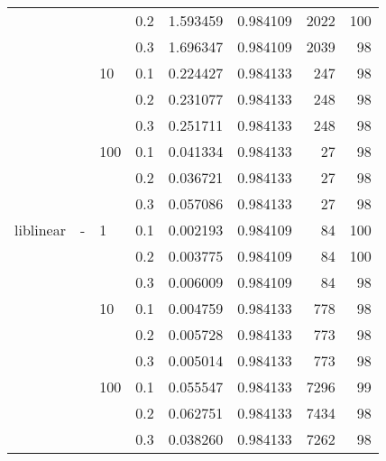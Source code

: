 \begin{table}[H]
\begin{tabular}{llllrrrr}
          &   &     & 0.2 &  1.593459 &  0.984109 &    2022 &   100 \\
          &   &     & 0.3 &  1.696347 &  0.984109 &    2039 &    98 \\
          &   & 10  & 0.1 &  0.224427 &  0.984133 &     247 &    98 \\
          &   &     & 0.2 &  0.231077 &  0.984133 &     248 &    98 \\
          &   &     & 0.3 &  0.251711 &  0.984133 &     248 &    98 \\
          &   & 100 & 0.1 &  0.041334 &  0.984133 &      27 &    98 \\
          &   &     & 0.2 &  0.036721 &  0.984133 &      27 &    98 \\
          &   &     & 0.3 &  0.057086 &  0.984133 &      27 &    98 \\
liblinear & - & 1   & 0.1 &  0.002193 &  0.984109 &      84 &   100 \\
          &   &     & 0.2 &  0.003775 &  0.984109 &      84 &   100 \\
          &   &     & 0.3 &  0.006009 &  0.984109 &      84 &    98 \\
          &   & 10  & 0.1 &  0.004759 &  0.984133 &     778 &    98 \\
          &   &     & 0.2 &  0.005728 &  0.984133 &     773 &    98 \\
          &   &     & 0.3 &  0.005014 &  0.984133 &     773 &    98 \\
          &   & 100 & 0.1 &  0.055547 &  0.984133 &    7296 &    99 \\
          &   &     & 0.2 &  0.062751 &  0.984133 &    7434 &    98 \\
          &   &     & 0.3 &  0.038260 &  0.984133 &    7262 &    98 \\
\bottomrule
\end{tabular}
\end{table}
